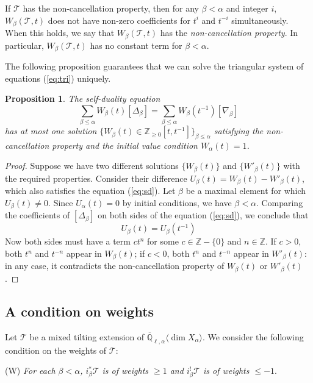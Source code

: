 \documentclass{amsart}
\theoremstyle{plain}
\newtheorem{prop}[subsubsection]{Proposition}
\theoremstyle{definition}
\theoremstyle{remark}
\numberwithin{equation}{subsection}
\begin{document}
If ${\mathcal{T}}$ has the non-cancellation property, then for any $\beta<\alpha$ and integer $i$, $W_\beta({\mathcal{T}},t)$ does not have non-zero coefficients for $t^i$ and $t^{-i}$ simultaneously. When this holds, we say that $W_\beta({\mathcal{T}},t)$ has the {\em non-cancellation property}. In particular, $W_\beta({\mathcal{T}},t)$ has no constant term for $\beta<\alpha$.

The following proposition guarantees that we can solve the triangular system of equations (\ref{eq:tri}) uniquely.
\begin{prop}\label{p:uni}
The self-duality equation
\begin{equation}\label{eq:sd}
\sum_{\beta\leq\alpha}W_\beta(t)[\Delta_\beta]=\sum_{\beta\leq\alpha}W_\beta(t^{-1})[\nabla_\beta]
\end{equation}
has at most one solution $\{W_\beta(t)\in{\mathbb{Z}}_{\geq0}[t,t^{-1}]\}_{\beta\leq\alpha}$ satisfying the non-cancellation property and the initial value condition $W_\alpha(t)=1$.
\end{prop}
\begin{proof}
Suppose we have two different solutions $\{W_\beta(t)\}$ and $\{W'_\beta(t)\}$ with the required properties. Consider their difference $U_\beta(t)=W_\beta(t)-W'_\beta(t)$, which also satisfies the equation (\ref{eq:sd}). Let $\beta$ be a maximal element for which $U_\beta(t)\neq0$. Since $U_\alpha(t)=0$ by initial conditions, we have $\beta<\alpha$. Comparing the coefficients of $[\Delta_\beta]$ on both sides of the equation (\ref{eq:sd}), we conclude that
\begin{equation*}
U_\beta(t)=U_\beta(t^{-1})
\end{equation*}
Now both sides must have a term $ct^n$ for some $c\in{\mathbb{Z}}-\{0\}$ and $n\in{\mathbb{Z}}$. If $c>0$, both $t^n$ and $t^{-n}$ appear in $W_\beta(t)$; if $c<0$, both $t^n$ and $t^{-n}$ appear in $W'_\beta(t)$: in any case, it contradicts the non-cancellation property of $W_\beta(t)$ or $W'_\beta(t)$.
\end{proof}

\subsection{A condition on weights}\label{ss:conW} Let ${\mathcal{T}}$ be a mixed tilting extension of ${\overline{\mathbb{Q}}_{\ell,\alpha}{\langle{{\dim X_\alpha}}\rangle}}$. We consider the following condition on the weights of ${\mathcal{T}}$:

(W) {\em For each $\beta<\alpha$, $i_\beta^*{\mathcal{T}}$ is of weights $\geq1$ and $i_\beta^!{\mathcal{T}}$ is of weights $\leq-1$}.
\end{document}
